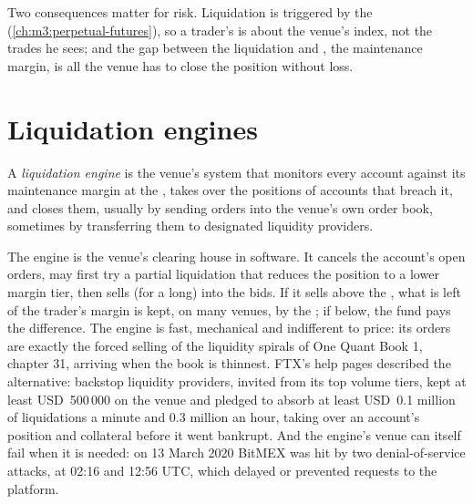 Two consequences matter for risk. Liquidation is triggered by the  (\cref{ch:m3:perpetual-futures}), so a
trader's  is about the venue's index, not the trades he sees; and the gap between the liquidation
and , the maintenance margin, is all the venue has to close the position without loss.

\section{Liquidation engines}

\begin{definition}\label{def:m3:margin-liquidation-and-loss-allocation:engine}
A \emph{liquidation engine} is the venue's system that monitors every account against
its maintenance margin at the , takes over the positions of accounts that breach it, and closes them,
usually by sending orders into the venue's own order book, sometimes by transferring them to designated
liquidity providers.
\end{definition}

The engine is the venue's clearing house in software. It cancels the account's open orders, may first try a
partial liquidation that reduces the position to a lower margin tier, then sells (for a long) into the bids. If it
sells above the , what is left of the trader's margin is kept, on many venues, by the ; if below, the fund pays the difference. The engine is fast, mechanical and indifferent to price: its orders
are exactly the forced selling of the liquidity spirals of One Quant Book 1, chapter 31, arriving when the book is thinnest.
FTX's help pages described the alternative: backstop liquidity providers, invited from its top volume tiers, kept at least USD~500\,000
on the venue and pledged to absorb at least USD~0.1 million of liquidations a minute and 0.3 million an hour, taking over an account's
position and collateral before it went bankrupt. And the engine's venue can itself fail when it is needed: on 13 March 2020 BitMEX was
hit by two denial-of-service attacks, at 02:16 and 12:56 UTC, which delayed or prevented requests to the platform.

